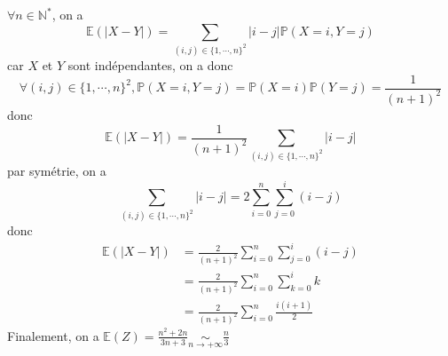 \documentclass[a4paper,12pt]{book}
\begin{document}
\subsection{}
$\forall n \in \mathbb{N}^{*}$, on a 
$$
\mathbb{E}(|X-Y|)=\sum_{(i,j)\in \{1,\cdots,n\}^2}|i-j|\mathbb{P}(X=i,Y=j)
$$
car $X$ et $Y$ sont indépendantes, on a donc 
$$
\forall (i,j)\in \{1,\cdots,n\}^2, \mathbb{P}(X=i,Y=j)=\mathbb{P}(X=i)\mathbb{P}(Y=j)=\frac{1}{(n+1)^2}
$$
donc 
$$
\mathbb{E}(|X-Y|)=\frac{1}{(n+1)^2}\sum_{(i,j)\in \{1,\cdots,n\}^2}|i-j|
$$
par symétrie, on a 
$$
\sum_{(i,j)\in \{1,\cdots,n\}^2}|i-j|=2\sum_{i=0}^n\sum_{j=0}^i(i-j)
$$
donc 
\begin{align*}
    \mathbb{E}(|X-Y|)&=\frac{2}{(n+1)^2}\sum_{i=0}^n\sum_{j=0}^i(i-j)\\
    &=\frac{2}{(n+1)^2}\sum_{i=0}^n\sum_{k=0}^ik\\
    &=\frac{2}{(n+1)^2}\sum_{i=0}^n\frac{i(i+1)}{2}
\end{align*}
Finalement, on a $\boxed{\mathbb{E}(Z)=\frac{n^2+2n}{3n+3} \mathop{\sim}\limits_{n \to +\infty}\frac{n}{3}}$
\end{document}
